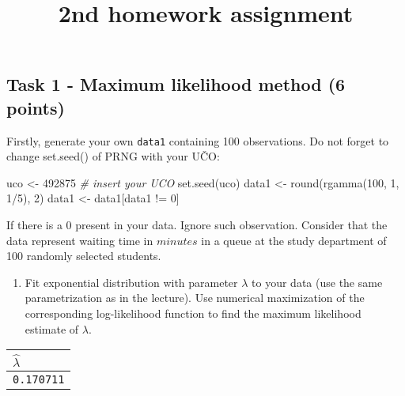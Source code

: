 \documentclass[
]{article}
\title{2nd homework assignment}
\author{}
\date{\vspace{-2.5em}}
\newenvironment{Shaded}{\begin{snugshade}}{\end{snugshade}}
\newcommand{\CommentTok}[1]{\textcolor[rgb]{0.56,0.35,0.01}{\textit{#1}}}
\newcommand{\DecValTok}[1]{\textcolor[rgb]{0.00,0.00,0.81}{#1}}
\newcommand{\FunctionTok}[1]{\textcolor[rgb]{0.00,0.00,0.00}{#1}}
\newcommand{\NormalTok}[1]{#1}
\newcommand{\OtherTok}[1]{\textcolor[rgb]{0.56,0.35,0.01}{#1}}
\newcommand{\SpecialCharTok}[1]{\textcolor[rgb]{0.00,0.00,0.00}{#1}}
\providecommand{\tightlist}{%
  \setlength{\itemsep}{0pt}\setlength{\parskip}{0pt}}
\begin{document}
\maketitle

\hypertarget{task-1---maximum-likelihood-method-6-points}{%
\subsection{Task 1 - Maximum likelihood method (6
points)}\label{task-1---maximum-likelihood-method-6-points}}

Firstly, generate your own \texttt{data1} containing 100 observations.
Do not forget to change set.seed() of PRNG with your UČO:

\begin{Shaded}
\begin{Highlighting}[]
\NormalTok{uco }\OtherTok{\textless{}{-}} \DecValTok{492875}  \CommentTok{\# insert your UCO}
\FunctionTok{set.seed}\NormalTok{(uco)}
\NormalTok{data1 }\OtherTok{\textless{}{-}} \FunctionTok{round}\NormalTok{(}\FunctionTok{rgamma}\NormalTok{(}\DecValTok{100}\NormalTok{, }\DecValTok{1}\NormalTok{, }\DecValTok{1}\SpecialCharTok{/}\DecValTok{5}\NormalTok{), }\DecValTok{2}\NormalTok{)}
\NormalTok{data1 }\OtherTok{\textless{}{-}}\NormalTok{ data1[data1 }\SpecialCharTok{!=} \DecValTok{0}\NormalTok{]}
\end{Highlighting}
\end{Shaded}

If there is a 0 present in your data. Ignore such observation. Consider
that the data represent waiting time in \(minutes\) in a queue at the
study department of 100 randomly selected students.

\begin{enumerate}
\def\labelenumi{\alph{enumi})}
\tightlist
\item
  Fit exponential distribution with parameter \(\lambda\) to your data
  (use the same parametrization as in the lecture). Use numerical
  maximization of the corresponding log-likelihood function to find the
  maximum likelihood estimate of \(\lambda\).
\end{enumerate}

\begin{longtable}[]{@{}l@{}}
\toprule()
\(\widehat{\lambda}\) \\
\midrule()
\endhead
\texttt{0.170711} \\
\bottomrule()
\end{longtable}
\end{document}
